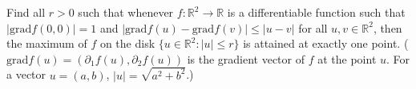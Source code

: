 \documentclass{article}
\begin{document}
\setlength{\parindent}{0pt}
Find all $r>0$ such that whenever $f:\mathbb{R}^{2}\to\mathbb{R}$ is a differentiable function such that $|\text{grad}f(0,0)|=1$ and $|\text{grad}f(u)-\text{grad}f(v)|\le|u-v|$ for all $u,v\in\mathbb{R}^{2}$, then the maximum of $f$ on the disk $\{u\in\mathbb{R}^{2}:|u|\le r\}$ is attained at exactly one point.\newline
($\text{grad}f(u)=(\partial_{1}f(u),\partial_{2}f(u))$ is the gradient vector of $f$ at the point $u$. For a vector $u=(a,b)$, $|u|=\sqrt{a^{2}+b^{2}}$.)
\end{document}
